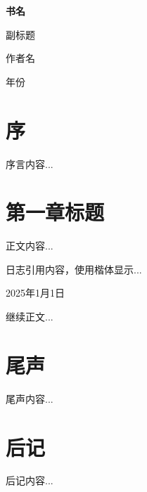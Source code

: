 \documentclass[11pt,a5paper,openany]{book}
\newcommand{\diarydate}[1]{%
    \par\noindent\textcolor{datecolor}{\small #1}\par\vspace{3pt}%
}
\begin{document}
\begin{titlepage}
    \centering
    \vspace*{3cm}
    {\Huge\bfseries 书名\par}
    \vspace{1cm}
    {\Large 副标题\par}
    \vspace{2cm}
    {\large 作者名\par}
    \vfill
    {\large 年份\par}
\end{titlepage}

\frontmatter
\tableofcontents

\mainmatter

\chapter*{序}

序言内容...

\chapter{第一章标题}

正文内容...

\begin{myquote}
日志引用内容，使用楷体显示...
\end{myquote}

\diarydate{2025年1月1日}

继续正文...

\chapter*{尾声}

尾声内容...

\backmatter

\chapter*{后记}

后记内容...
\end{document}
